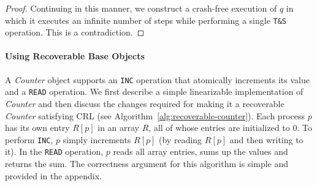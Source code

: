 \begin{proof}
Continuing in this manner, we construct a crash-free execution of $q$ in which it executes an infinite number of steps while performing a single \texttt{T\&S} operation. This is a contradiction.
\end{proof}




\paragraph*{Using Recoverable Base Objects}





A \textit{Counter} object supports an \texttt{INC} operation that atomically increments its value and a \texttt{READ} operation. We first describe a simple linearizable implementation of \textit{Counter} and then discuss the changes required for making it a recoverable \textit{Counter} satisfying CRL (see Algorithm~\ref{alg:recoverable-counter}). Each process $p$ has its own entry $R[p]$ in an array $R$, all of whose entries are initialized to 0. To perform \texttt{INC}, $p$ simply increments $R[p]$ (by reading $R[p]$ and then writing to it). In the \texttt{READ} operation, $p$ reads all array entries, sums up the values and returns the sum. The correctness argument for this algorithm is simple and provided in the appendix.

